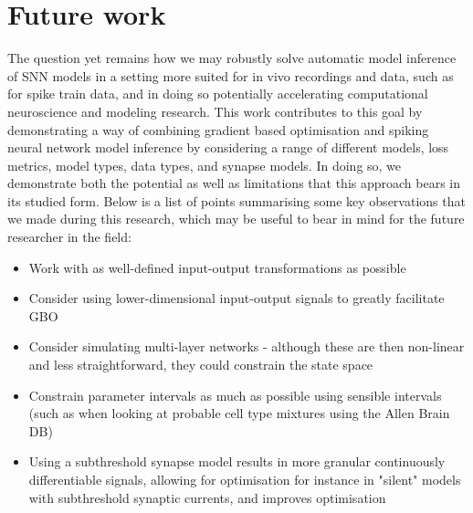 \documentclass[mphil,deptreport,ianc]{infthesis} %
\begin{document}


\section*{Future work}

The question yet remains how we may robustly solve automatic model inference of SNN models in a setting more suited for in vivo recordings and data, such as for spike train data, and in doing so potentially accelerating computational neuroscience and modeling research.
This work contributes to this goal by demonstrating a way of combining gradient based optimisation and spiking neural network model inference by considering a range of different models, loss metrics, model types, data types, and synapse models.
In doing so, we demonstrate both the potential as well as limitations that this approach bears in its studied form.
Below is a list of points summarising some key observations that we made during this research, which may be useful to bear in mind for the future researcher in the field:

\begin{itemize}
    \item Work with as well-defined input-output transformations as possible
    \item Consider using lower-dimensional input-output signals to greatly facilitate GBO
    \item Consider simulating multi-layer networks - although these are then non-linear and less straightforward, they could constrain the state space
    \item Constrain parameter intervals as much as possible using sensible intervals (such as when looking at probable cell type mixtures using the Allen Brain DB)
    \item Using a subthreshold synapse model results in more granular continuously differentiable signals, allowing for optimisation for instance in "silent" models with subthreshold synaptic currents, and improves optimisation
\end{itemize}
\end{document}
